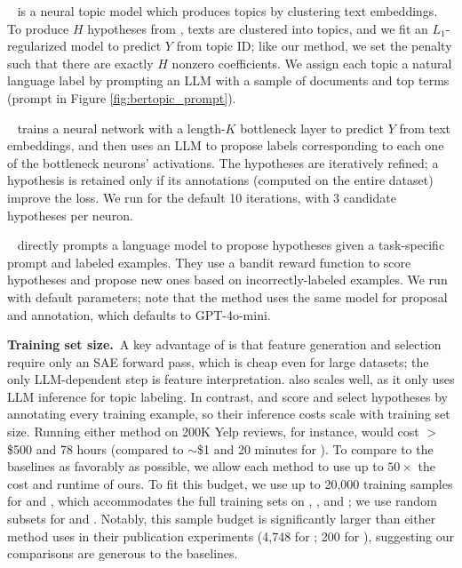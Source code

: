 \textbf{\bertopic}~\cite{grootendorst_bertopic_2022} is a neural topic model which produces topics by clustering text embeddings.
To produce $H$ hypotheses from \bertopic, texts are clustered into topics, and we fit an $L_1$-regularized model to predict $Y$ from topic ID; like our method, we set the penalty such that there are exactly $H$ nonzero coefficients. 
We assign each topic a natural language label by prompting an LLM with a sample of documents and top terms (prompt in Figure \ref{fig:bertopic_prompt}).

\textbf{\nlparam}~\cite{zhong_explaining_2024} trains a neural network with a length-$K$ bottleneck layer to predict $Y$ from text embeddings, and then uses an LLM to propose labels corresponding to each one of the bottleneck neurons' activations. 
The hypotheses are iteratively refined; a hypothesis is retained only if its annotations (computed on the entire dataset) improve the loss.
We run \nlparam for the default 10 iterations, with 3 candidate hypotheses per neuron. %

\textbf{\hypogenic}~\cite{zhou_hypothesis_2024} directly prompts a language model to propose hypotheses given a task-specific prompt and labeled examples.
They use a bandit reward function to score hypotheses and propose new ones based on incorrectly-labeled examples. 
We run \hypogenic with default parameters; note that the method uses the same model for proposal and annotation, which defaults to GPT-4o-mini.

\textbf{Training set size.}~A key advantage of \ourmethod is that feature generation and selection require only an SAE forward pass, which is cheap even for large datasets; the only LLM-dependent step is feature interpretation.
\bertopic also scales well, as it only uses LLM inference for topic labeling.
In contrast, \nlparam and \hypogenic score and select hypotheses by annotating every training example, so their inference costs scale with training set size. 
Running either method on 200K Yelp reviews, for instance, would cost $>$\$500 and 78 hours (compared to $\sim$\$1 and 20 minutes for \ourmethod). 
To compare to the baselines as favorably as possible, we allow each method to use up to $50\times$ the cost and runtime of ours. 
To fit this budget, we use up to 20,000 training samples for \nlparam and \hypogenic, which accommodates the full training sets on \wiki, \bills, and \headlines; we use random subsets for \yelp and \congress. 
Notably, this sample budget is significantly larger than either method uses in their publication experiments (4,748 for \nlparam; 200 for \hypogenic), suggesting our comparisons are generous to the baselines. 






